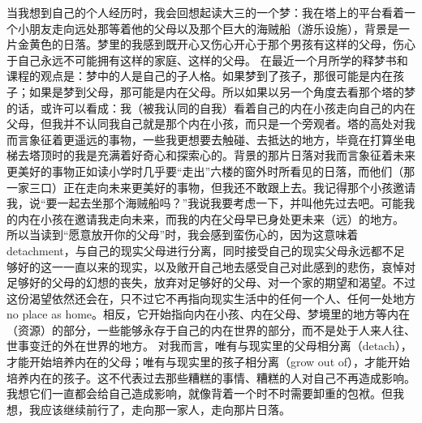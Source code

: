 当我想到自己的个人经历时，我会回想起读大三的一个梦：我在塔上的平台看着一个小朋友走向远处那等着他的父母以及那个巨大的海贼船（游乐设施），背景是一片金黄色的日落。梦里的我感到既开心又伤心\pozhehao{}开心于那个男孩有这样的父母，伤心于自己永远不可能拥有这样的家庭、这样的父母。
在最近一个月所学的释梦书和课程的观点是：梦中的人是自己的子人格。如果梦到了孩子，那很可能是内在孩子；如果是梦到父母，那可能是内在父母。所以如果以另一个角度去看那个塔的梦的话，或许可以看成：我（被我认同的自我）看着自己的内在小孩走向自己的内在父母，但我并不认同我自己就是那个内在小孩，而只是一个旁观者。塔的高处对我而言象征着更遥远的事物，一些我更想要去触碰、去抵达的地方，毕竟在打算坐电梯去塔顶时的我是充满着好奇心和探索心的。背景的那片日落对我而言象征着未来更美好的事物\pozhehao{}正如读小学时几乎要“走出”六楼的窗外时所看见的日落，而他们（那一家三口）正在走向未来更美好的事物，但我还不敢跟上去。我记得那个小孩邀请我，说“要一起去坐那个海贼船吗？”我说我要考虑一下，并叫他先过去吧。可能我的内在小孩在邀请我走向未来，而我的内在父母早已身处更未来（远）的地方。
所以当读到“愿意放开你的父母”时，我会感到蛮伤心的，因为这意味着detachment，与自己的现实父母进行分离，同时接受自己的现实父母永远都不足够好的这一一直以来的现实，以及敞开自己地去感受自己对此感到的悲伤，哀悼对足够好的父母的幻想的丧失，放弃对足够好的父母、对一个家的期望和渴望。不过这份渴望依然还会在，只不过它不再指向现实生活中的任何一个人、任何一处地方\pozhehao{}no place as home。相反，它开始指向内在小孩、内在父母、梦境里的地方等内在（资源）的部分，一些能够永存于自己的内在世界的部分，而不是处于人来人往、世事变迁的外在世界的地方。
对我而言，唯有与现实里的父母相分离（detach），才能开始培养内在的父母；唯有与现实里的孩子相分离（grow out of），才能开始培养内在的孩子。这不代表过去那些糟糕的事情、糟糕的人对自己不再造成影响。我想它们一直都会给自己造成影响，就像背着一个时不时需要卸重的包袱。但我想，我应该继续前行了，走向那一家人，走向那片日落。

